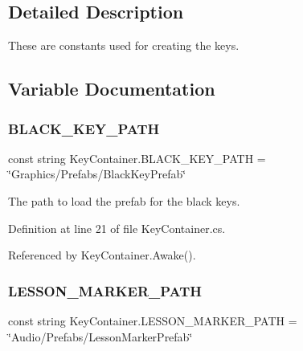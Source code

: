 \subsection{Detailed Description}
These are constants used for creating the keys. 

\subsection{Variable Documentation}
\mbox{\label{group___key_contain_const_gac968b0d398c545a13abad255d8287825}} 
\subsubsection{\texorpdfstring{B\+L\+A\+C\+K\+\_\+\+K\+E\+Y\+\_\+\+P\+A\+TH}{BLACK\_KEY\_PATH}}
{\footnotesize\ttfamily const string Key\+Container.\+B\+L\+A\+C\+K\+\_\+\+K\+E\+Y\+\_\+\+P\+A\+TH = \char`\"{}Graphics/Prefabs/Black\+Key\+Prefab\char`\"{}\hspace{0.3cm}{\ttfamily [private]}}



The path to load the prefab for the black keys. 



Definition at line 21 of file Key\+Container.\+cs.



Referenced by Key\+Container.\+Awake().

\mbox{\label{group___key_contain_const_ga4caccd17bb57caca66047951046aa44a}} 
\subsubsection{\texorpdfstring{L\+E\+S\+S\+O\+N\+\_\+\+M\+A\+R\+K\+E\+R\+\_\+\+P\+A\+TH}{LESSON\_MARKER\_PATH}}
{\footnotesize\ttfamily const string Key\+Container.\+L\+E\+S\+S\+O\+N\+\_\+\+M\+A\+R\+K\+E\+R\+\_\+\+P\+A\+TH = \char`\"{}Audio/Prefabs/Lesson\+Marker\+Prefab\char`\"{}\hspace{0.3cm}{\ttfamily [private]}}



